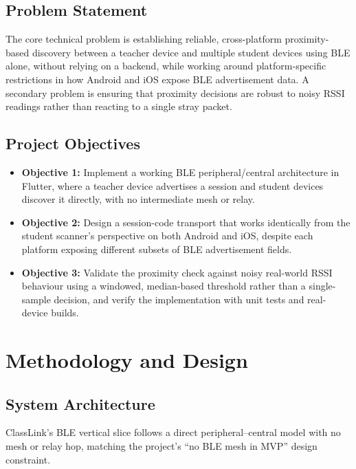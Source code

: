 \documentclass[12pt,a4paper]{report}
\begin{document}
\section{Problem Statement}
The core technical problem is establishing reliable, cross-platform proximity-based discovery between a teacher device and multiple student devices using BLE alone, without relying on a backend, while working around platform-specific restrictions in how Android and iOS expose BLE advertisement data. A secondary problem is ensuring that proximity decisions are robust to noisy RSSI readings rather than reacting to a single stray packet.

\section{Project Objectives}
\begin{itemize}
  \item \textbf{Objective 1:} Implement a working BLE peripheral/central architecture in Flutter, where a teacher device advertises a session and student devices discover it directly, with no intermediate mesh or relay.
  \item \textbf{Objective 2:} Design a session-code transport that works identically from the student scanner's perspective on both Android and iOS, despite each platform exposing different subsets of BLE advertisement fields.
  \item \textbf{Objective 3:} Validate the proximity check against noisy real-world RSSI behaviour using a windowed, median-based threshold rather than a single-sample decision, and verify the implementation with unit tests and real-device builds.
\end{itemize}

\chapter{Methodology and Design}

\section{System Architecture}
ClassLink's BLE vertical slice follows a direct peripheral--central model with no mesh or relay hop, matching the project's ``no BLE mesh in MVP'' design constraint.
\end{document}

